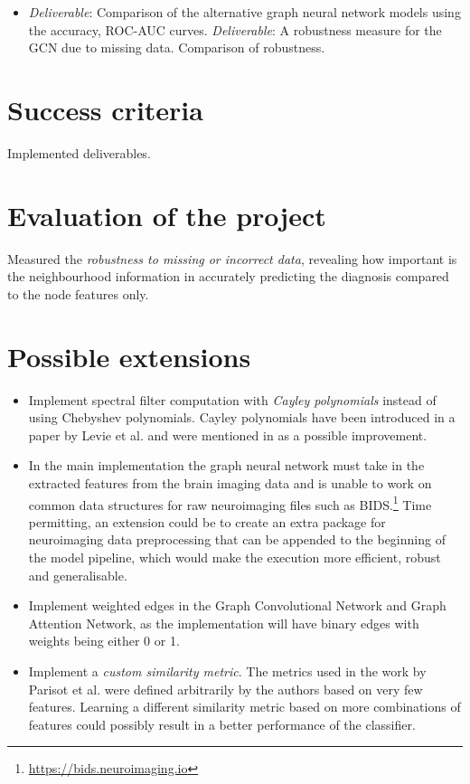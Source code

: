 \documentclass[12pt,a4paper,twoside]{article}
\begin{document}
\begin{itemize}
  \item  \textit{Deliverable}: Comparison of the alternative graph neural network models using the accuracy, ROC-AUC curves. \textit{Deliverable}: A robustness measure for the GCN due to missing data. Comparison of robustness.
\end{itemize}

\section*{Success criteria}
Implemented deliverables.

\section*{Evaluation of the project}
Measured the \textit{robustness to missing or incorrect data}, revealing how important is the neighbourhood information in accurately predicting the diagnosis compared to the node features only.

\section*{Possible extensions}
\begin{itemize}
  \item Implement spectral filter computation with \textit{Cayley polynomials} instead of using Chebyshev polynomials. Cayley polynomials have been introduced in a paper by Levie et al. \cite{levie2017cayleynets} and were mentioned in \cite{parisot2018disease} as a possible improvement.
  \item In the main implementation the graph neural network must take in the extracted features from the brain imaging data and is unable to work on common data structures for raw neuroimaging files such as BIDS.\footnote{\url{https://bids.neuroimaging.io}} Time permitting, an extension could be to create an extra package for neuroimaging data preprocessing that can be appended to the beginning of the model pipeline, which would make the execution more efficient, robust and generalisable.  
  \item Implement weighted edges in the Graph Convolutional Network and Graph Attention Network, as the implementation will have binary edges with weights being either 0 or 1.
  \item Implement a \textit{custom similarity metric}. The metrics used in the work by Parisot et al. \cite{parisot2018disease} were defined arbitrarily by the authors based on very few features. Learning a different similarity metric based on more combinations of features could possibly result in a better performance of the classifier.

\end{itemize}
\end{document}

